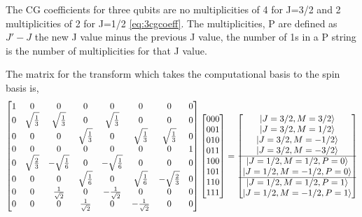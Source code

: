 \documentclass[12pt]{article}
\newcommand{\rtwo}{\sqrt{2}}
\begin{document}
The CG coefficients for three qubits are no multiplicities of 4 for J=3/2 and 2 multiplicities of 2 for J=1/2  \autoref{eq:3cgcoeff}. The multiplicities, P are defined as $J'-J$ the new J value minus the previous J value, the number of 1s in a P string is the number of multiplicities for that J value.


The matrix for the transform which takes the computational basis to the spin basis is,
\begin{align}
\begin{bmatrix}
1 &0 &0 &0 &0 &0 &0 &0 \\
0 &\sqrt{\frac{1}{3}} &\sqrt{\frac{1}{3}} &0 &\sqrt{\frac{1}{3}} &0 &0 &0\\
0 &0 &0 &\sqrt{\frac{1}{3}} &0 &\sqrt{\frac{1}{3}} &\sqrt{\frac{1}{3}} &0 \\
0 &0 &0 &0 &0 &0 &0 &1 \\
0 &\sqrt{\frac{2}{3}} &-\sqrt{\frac{1}{6}} &0 &-\sqrt{\frac{1}{6}} &0 &0 &0\\
0 &0 &0 &\sqrt{\frac{1}{6}} &0 &\sqrt{\frac{1}{6}} &-\sqrt{\frac{2}{3}} &0 \\
0 &0 &\frac{1}{\rtwo} &0 &-\frac{1}{\rtwo} &0 &0 &0 \\
0 &0 &0 &\frac{1}{\rtwo} &0 &-\frac{1}{\rtwo} &0 &0 \\
\end{bmatrix}
%
\begin{bmatrix}
000 \\
001 \\
010 \\
011 \\
100 \\
101 \\
110 \\
111 \\
\end{bmatrix}
=
\begin{bmatrix}
\ket{J=3/2, M=3/2} \\
\ket{J=3/2, M=1/2} \\
\ket{J=3/2, M=-1/2} \\
\ket{J=3/2, M=-3/2} \\ 
\hline
\ket{J=1/2, M=1/2, P=0} \\
\ket{J=1/2, M=-1/2, P=0} \\
\hline
\ket{J=1/2, M=1/2, P=1} \\
\ket{J=1/2, M=-1/2, P=1} \\ 
\end{bmatrix}
\label{eq:3qubitcg}
\end{align}
\end{document}
